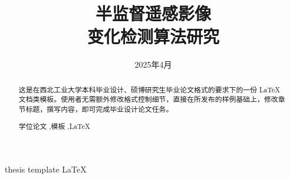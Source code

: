 \documentclass[lang=chs, degree=master, blindreview=false, adobe=false]{yanputhesis}
\title{半监督遥感影像 \\ 变化检测算法研究}{          %
   Research on semi-supervised \\ remote Sensing image change detection algorithm
}                                                           %
\author{\blindreview{温冬成}}{\blindreview{Dongcheng Wen}}  %
\date{2025年4月}{April 2025}                                  %
\begin{document}
\frontmatter                                                %
\maketitle                                                  %
\begin{abstract}                                            %
    这是在西北工业大学本科毕业设计、硕博研究生毕业论文格式的要求下的一份 LaTeX
    文档类模板。使用者无需额外修改格式控制细节，直接在所发布的样例基础上，修改章
    节标题，撰写内容，即可完成毕业设计论文任务。            %
    \begin{keywords}                                        %
        学位论文 \sep 模板 \sep \LaTeX                      %
    \end{keywords}                                          %
\end{abstract}                                              %
\begin{engabstract}                                         %
    \noindent \blindtext                                    %
    \begin{engkeywords}                                     %
        thesis \ensep template \ensep \LaTeX                %
    \end{engkeywords}                                       %
\end{engabstract}                                           %
\tableofcontents                                            %
\listoffigures                                              %
\listoftables                                               %
\printnomenclature                                          %
\mainmatter
\sDefault
\end{document}
